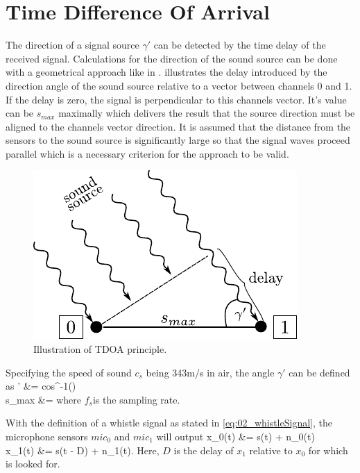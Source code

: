 \section{Time Difference Of Arrival}
\label{sec:02_tdoa}

The direction of a signal source $\gamma'$ can be detected by the time delay of
the received signal.
Calculations for the direction of the sound source can be done with a
geometrical approach like in \cite{Valin_Michaud}.
 illustrates the delay introduced by the direction angle
of the sound source relative to a vector between channels 0 and 1.
If the delay is zero, the signal is perpendicular to this channels vector.
It's value can be $s_{max}$ maximally which delivers the result that the source
direction must be aligned to the channels vector direction.
It is assumed that the distance from the sensors to the sound source is
significantly large so that the signal waves proceed parallel which is a necessary
criterion for the approach to be valid.
\begin{figure}[ht]
	\centering
		\includegraphics[width=0.4\columnwidth]{figures/tdoa_waves}
	\caption{Illustration of TDOA principle.}
    \label{fig:02_tdoa}
\end{figure}

Specifying the speed of sound $c_s$ being 343\si{m/s} in air, the angle
$\gamma'$ can be defined as
\bsub \bal
    \gamma' &= cos^{-1}()
    \label{eq:02_tdoaAngle}\\
    s_{max} &= 
\eal \esub
where $f_s$is the sampling rate.

With the definition of a whistle signal as stated in \cref{eq:02_whistleSignal},
the microphone sensors $mic_0$ and $mic_1$ will output
\bsub \bal
    x_0(t) &= s(t) + n_0(t)\\
    x_1(t) &= \alpha s(t - D) + n_1(t).
\eal \esub
\label{eq:02_signalTimeDomain}
Here, $D$ is the delay of $x_1$ relative to $x_0$ for which is looked for.